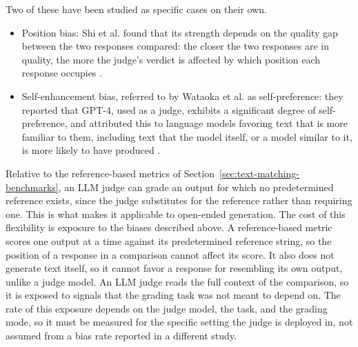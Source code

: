 Two of these have been studied as specific cases on their own.
\begin{itemize}
	\item Position bias: Shi et al. found that its strength depends on the quality gap between the two responses compared: the closer the two responses are in quality, the more the judge's verdict is affected by which position each response occupies \cite{shiJudgingJudgesSystematic2025}.
	\item Self-enhancement bias, referred to by Wataoka et al. as self-preference: they reported that GPT-4, used as a judge, exhibits a significant degree of self-preference, and attributed this to language models favoring text that is more familiar to them, including text that the model itself, or a model similar to it, is more likely to have produced \cite{wataokaSelfPreferenceBiasLLMasaJudge2025}.
\end{itemize}

Relative to the reference-based metrics of Section~\ref{sec:text-matching-benchmarks}, an LLM judge can grade an output for which no predetermined reference exists, since the judge substitutes for the reference rather than requiring one. This is what makes it applicable to open-ended generation. The cost of this flexibility is exposure to the biases described above. A reference-based metric scores one output at a time against its predetermined reference string, so the position of a response in a comparison cannot affect its score. It also does not generate text itself, so it cannot favor a response for resembling its own output, unlike a judge model. An LLM judge reads the full context of the comparison, so it is exposed to signals that the grading task was not meant to depend on. The rate of this exposure depends on the judge model, the task, and the grading mode, so it must be measured for the specific setting the judge is deployed in, not assumed from a bias rate reported in a different study.

